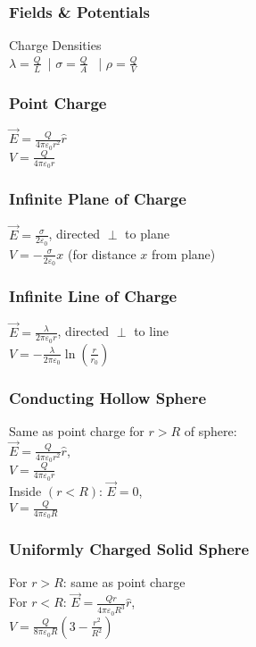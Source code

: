 \subsubsection*{Fields \& Potentials}
Charge Densities\\
$\lambda = \frac{Q}{L}$\, | $\sigma = \frac{Q}{A}$ \, |
$\rho = \frac{Q}{V}$

\subsubsection*{Point Charge}
$\vec{E} = \frac{Q}{4\pi\varepsilon_0 r^2} \hat{r}$\\
$V = \frac{Q}{4\pi\varepsilon_0 r}$

\subsubsection*{Infinite Plane of Charge}
$\vec{E} = \frac{\sigma}{2\varepsilon_0}$, directed $\perp$ to plane\\
$V = -\frac{\sigma}{2\varepsilon_0}x$ (for distance $x$ from plane)

\subsubsection*{Infinite Line of Charge}
$\vec{E} = \frac{\lambda}{2\pi\varepsilon_0 r}$, directed $\perp$ to line\\
$V = -\frac{\lambda}{2\pi\varepsilon_0}\ln\!\left(\frac{r}{r_0}\right)$

\subsubsection*{Conducting Hollow Sphere}
Same as point charge for $r > R$ of sphere:\\
$\vec{E} = \frac{Q}{4\pi\varepsilon_0 r^2}\hat{r}$, \\
$V = \frac{Q}{4\pi\varepsilon_0 r}$\\
Inside $(r < R)$: $\vec{E} = 0$, \\ $V = \frac{Q}{4\pi\varepsilon_0 R}$

\subsubsection*{Uniformly Charged Solid Sphere}
For $r > R$: same as point charge\\
For $r < R$: $\vec{E} = \frac{Qr}{4\pi\varepsilon_0 R^3}\hat{r}$,\\
$V = \frac{Q}{8\pi\varepsilon_0 R}\left(3 - \frac{r^2}{R^2}\right)$

